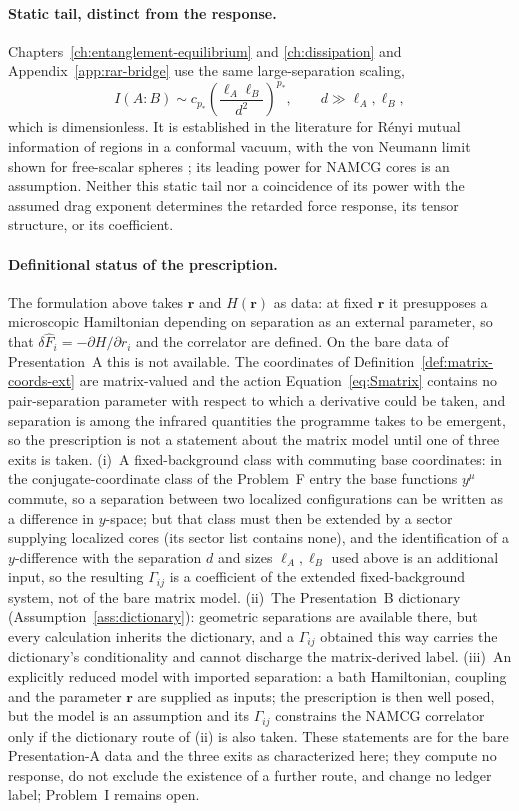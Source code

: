 \paragraph{Static tail, distinct from the response.}
Chapters~\ref{ch:entanglement-equilibrium} and \ref{ch:dissipation}
and Appendix~\ref{app:rar-bridge} use the same large-separation
scaling,
\[
I(A:B)\sim c_{p_*}
\left(\frac{\ell_A\ell_B}{d^2}\right)^{p_*},
\qquad d\gg\ell_A,\ell_B,
\]
which is dimensionless. It is established in the literature for
R\'enyi mutual information of regions in a conformal vacuum, with the
von Neumann limit shown for free-scalar spheres
\cite{Cardy2013MI}; its leading power for NAMCG cores is an
assumption. Neither this static tail nor a coincidence of its power
with the assumed drag exponent determines the retarded force
response, its tensor structure, or its coefficient.

\paragraph{Definitional status of the prescription.} The formulation above takes \(\mathbf r\) and \(H(\mathbf r)\) as data: at fixed \(\mathbf r\) it presupposes a microscopic Hamiltonian depending on separation as an external parameter, so that \(\delta\hat F_i=-\partial H/\partial r_i\) and the correlator are defined. On the bare data of Presentation~A this is not available. The coordinates of Definition~\ref{def:matrix-coords-ext} are matrix-valued and the action Equation~\eqref{eq:Smatrix} contains no pair-separation parameter with respect to which a derivative could be taken, and separation is among the infrared quantities the programme takes to be emergent, so the prescription is not a statement about the matrix model until one of three exits is taken. (i)~A fixed-background class with commuting base coordinates: in the conjugate-coordinate class of the Problem~F entry the base functions \(y^\mu\) commute, so a separation between two localized configurations can be written as a difference in \(y\)-space; but that class must then be extended by a sector supplying localized cores (its sector list contains none), and the identification of a \(y\)-difference with the separation \(d\) and sizes \(\ell_A,\ell_B\) used above is an additional input, so the resulting \(\Gamma_{ij}\) is a coefficient of the extended fixed-background system, not of the bare matrix model. (ii)~The Presentation~B dictionary (Assumption~\ref{ass:dictionary}): geometric separations are available there, but every calculation inherits the dictionary, and a \(\Gamma_{ij}\) obtained this way carries the dictionary's conditionality and cannot discharge the matrix-derived label. (iii)~An explicitly reduced model with imported separation: a bath Hamiltonian, coupling and the parameter \(\mathbf r\) are supplied as inputs; the prescription is then well posed, but the model is an assumption and its \(\Gamma_{ij}\) constrains the NAMCG correlator only if the dictionary route of (ii) is also taken. These statements are for the bare Presentation-A data and the three exits as characterized here; they compute no response, do not exclude the existence of a further route, and change no ledger label; Problem~I remains open.

